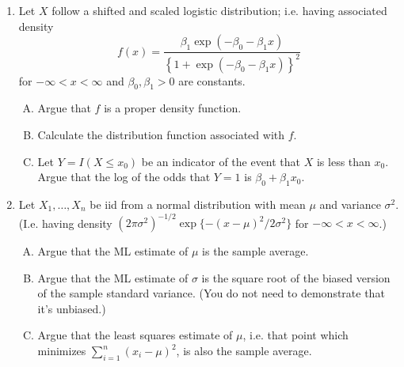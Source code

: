 \documentclass[12pt]{article}
\begin{document}
\begin{enumerate}[1.]
\newpage

\item Let $X$ follow a shifted and scaled logistic distribution; i.e. having associated density
$$
f(x) = \frac{\beta_1\exp( -\beta_0 - \beta_1 x )}{\left\{1 + \exp( -\beta_0 - \beta_1 x ) \right\}^{2}}
$$
for $-\infty < x < \infty$ and $\beta_0, \beta_1 > 0$ are constants.  
\begin{enumerate}[A.]
\item Argue that $f$ is a proper density function. 
\item Calculate the distribution function associated with $f$.
\item Let $Y = I(X \leq x_0)$ be an indicator of the event that $X$ is
  less than $x_0$. Argue that the log of the odds that $Y = 1$ is
  $\beta_0 + \beta_1 x_0$.
\end{enumerate}

\newpage

\item Let $X_1,\ldots, X_n$ be iid from a normal distribution with mean $\mu$ and variance $\sigma^2$. 
(I.e. having density $(2\pi \sigma^2)^{-1/2} \exp\{-(x - \mu)^2 / 2\sigma^2\}$ for $-\infty < x < \infty$.)
  \begin{enumerate}[A.]
  \item Argue that the ML estimate of $\mu$ is the sample average.
  \item Argue that the ML estimate of $\sigma$ is the square root of the biased version of the sample standard variance. (You do not need to demonstrate that it's unbiased.)
  \item Argue that the least squares estimate of $\mu$, i.e. that point which minimizes
    $\sum_{i=1}^n (x_i - \mu)^2$, is also the sample average.
  \end{enumerate}

\end{enumerate}
\end{document}
